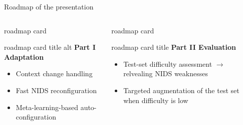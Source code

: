 \begin{frame}{Roadmap of the presentation}
	\small


	\centering
	\vspace*{0.2em}

	\begin{columns}[T,onlytextwidth]
		\begin{beamercolorbox}[wd=\linewidth,sep=0pt,rounded=true]{roadmap card}
			\begin{beamercolorbox}[wd=\linewidth,sep=1ex,rounded=true]{roadmap card title alt}
				\centering \textbf{Part I \quad Adaptation}
			\end{beamercolorbox}
			\begin{minipage}[t][4.2cm][t]{\linewidth}
				\vspace*{0.05cm}
				\raggedright
				\hspace*{0.03\linewidth}\parbox{0.94\linewidth}{%
					\footnotesize
					\begin{itemize}
						\setlength\itemsep{0.45em}
						\item Context change handling
						\item Fast NIDS reconfiguration
						\item Meta-learning-based auto-configuration
					\end{itemize}}
			\end{minipage}
		\end{beamercolorbox}

		\begin{beamercolorbox}[wd=\linewidth,sep=0pt,rounded=true]{roadmap card}
			\begin{beamercolorbox}[wd=\linewidth,sep=1ex,rounded=true]{roadmap card title}
				\centering \textbf{Part II \quad Evaluation}
			\end{beamercolorbox}
			\begin{minipage}[t][4.2cm][t]{\linewidth}
				\vspace*{0.05cm}
				\raggedright
				\hspace*{0.03\linewidth}\parbox{0.94\linewidth}{%
					\footnotesize
					\begin{itemize}
						\setlength\itemsep{0.45em}
						\item Test-set difficulty assessment \(\rightarrow\) relvealing NIDS weaknesses
						\item Targeted augmentation of the test set when difficulty is low
					\end{itemize}}
			\end{minipage}
		\end{beamercolorbox}
	\end{columns}


\end{frame}
